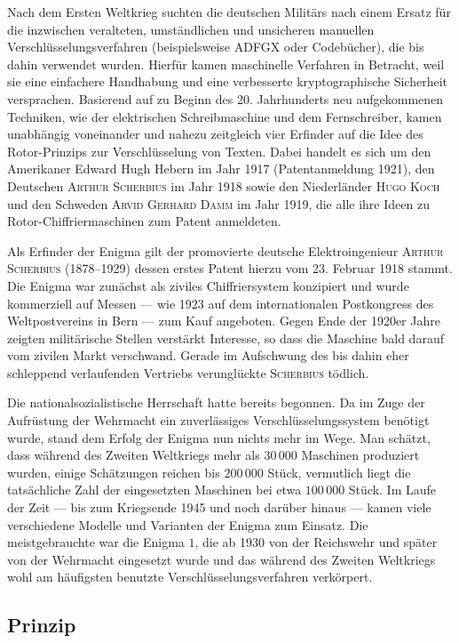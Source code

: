 \documentclass[%
<<<<<<< Updated upstream
11pt,%
twoside,%
titlepage,%
german,%
headsepline%
]{scrartcl}
\begin{document}
Nach dem Ersten Weltkrieg suchten die deutschen Militärs nach einem Ersatz für die inzwischen veralteten, umständlichen und unsicheren manuellen Verschlüsselungsverfahren (beispielsweise ADFGX oder Codebücher), die bis dahin verwendet wurden. Hierfür kamen maschinelle Verfahren in Betracht, weil sie eine einfachere Handhabung und eine verbesserte kryptographische Sicherheit versprachen. Basierend auf zu Beginn des 20. Jahrhunderts neu aufgekommenen Techniken, wie der elektrischen Schreibmaschine und dem Fernschreiber, kamen unabhängig voneinander und nahezu zeitgleich vier Erfinder auf die Idee des Rotor-Prinzips zur Verschlüsselung von Texten. Dabei handelt es sich um den Amerikaner Edward Hugh Hebern im Jahr 1917 (Patentanmeldung 1921), den Deutschen \textsc{Arthur Scherbius} im Jahr 1918 sowie den Niederländer \textsc{Hugo Koch} und den Schweden \textsc{Arvid Gerhard Damm} im Jahr 1919, die alle ihre Ideen zu Rotor-Chiffriermaschinen zum Patent anmeldeten.

Als Erfinder der Enigma gilt der promovierte deutsche Elektroingenieur \textsc{Arthur Scherbius} (1878--1929) dessen erstes Patent hierzu vom 23. Februar 1918 stammt. Die Enigma war zunächst als ziviles Chiffriersystem konzipiert und wurde kommerziell auf Messen --- wie 1923 auf dem internationalen Postkongress des Weltpostvereins in Bern --- zum Kauf angeboten. Gegen Ende der 1920er Jahre zeigten militärische Stellen verstärkt Interesse, so dass die Maschine bald darauf vom zivilen Markt verschwand. Gerade im Aufschwung des bis dahin eher schleppend verlaufenden Vertriebs verunglückte \textsc{Scherbius} tödlich.

Die nationalsozialistische Herrschaft hatte bereits begonnen. Da im Zuge der Aufrüstung der Wehrmacht ein zuverlässiges Verschlüsselungssystem benötigt wurde, stand dem Erfolg der Enigma nun nichts mehr im Wege.
Man schätzt, dass während des Zweiten Weltkriegs mehr als $30\,000$ Maschinen produziert wurden, einige Schätzungen reichen bis $200\,000$ Stück, vermutlich liegt die tatsächliche Zahl der eingesetzten Maschinen bei etwa $100\,000$ Stück. Im Laufe der Zeit --- bis zum Kriegsende 1945 und noch darüber hinaus --- kamen viele verschiedene Modelle und Varianten der Enigma zum Einsatz. Die meistgebrauchte war die Enigma ${1}$, die ab 1930 von der Reichswehr und später von der Wehrmacht eingesetzt wurde und das während des Zweiten Weltkriegs wohl am häufigsten benutzte Verschlüsselungsverfahren verkörpert.

\subsection{Prinzip}
\end{document}
